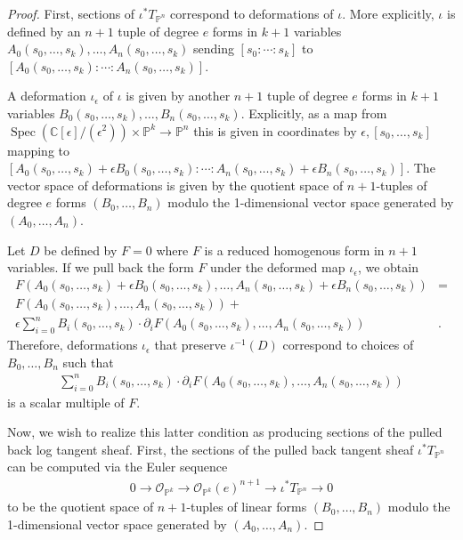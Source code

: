\documentclass[11pt,reqno]{amsart}
\theoremstyle{plain}
\theoremstyle{definition}
\theoremstyle{remark}
\numberwithin{equation}{section}
\renewcommand{\to}{{\longrightarrow}}
\numberwithin{equation}{section}
\begin{document}
\begin{proof}
First, sections of $\iota^{*}T_{\mathbb{P}^n}$ correspond to deformations of $\iota$. More explicitly, $\iota$ is defined by an $n+1$ tuple of degree $e$ forms in $k+1$ variables $A_0(s_0,\ldots,s_k),\ldots,A_n(s_0,\ldots,s_k)$ sending $[s_0:\cdots:s_k]$ to $[A_0(s_0,\ldots,s_k):\cdots:A_n(s_0,\ldots,s_k)]$.

A deformation $\iota_{\epsilon}$ of $\iota$ is given by another $n+1$ tuple of degree $e$ forms in $k+1$ variables $B_0(s_0,\ldots,s_k),\ldots,B_n(s_0,\ldots,s_k)$. Explicitly, as a map from $\operatorname{Spec}(\mathbb{C}[\epsilon]/(\epsilon^2))\times \mathbb{P}^k\to \mathbb{P}^n$ this is given in coordinates by $\epsilon,[s_0,\ldots,s_k]$ mapping to $[A_0(s_0,\ldots,s_k)+\epsilon B_0(s_0,\ldots,s_k):\cdots:A_n(s_0,\ldots,s_k)+\epsilon B_n(s_0,\ldots,s_k)]$. The vector space of deformations is given by the quotient space of $n+1$-tuples of degree $e$ forms $(B_0,\ldots,B_{n})$ modulo the 1-dimensional vector space generated by $(A_0,\ldots,A_{n})$.

Let $D$ be defined by $F=0$ where $F$ is a reduced homogenous form in $n+1$ variables. If we pull back the form $F$ under the deformed map  $\iota_{\epsilon}$, we obtain
\begin{align*}
    F(A_0(s_0,\ldots,s_k)+\epsilon B_0(s_0,\ldots,s_k),\ldots,A_n(s_0,\ldots,s_k)+\epsilon B_n(s_0,\ldots,s_k))&=\\
    F(A_0(s_0,\ldots,s_k),\ldots,A_n(s_0,\ldots,s_k))+&\\\epsilon \sum_{i=0}^{n}B_i(s_0,\ldots,s_k) \cdot \partial_iF (A_0(s_0,\ldots,s_k),\ldots,A_n(s_0,\ldots,s_k))&.
\end{align*}
Therefore, deformations $\iota_{\epsilon}$ that preserve $\iota^{-1}(D)$ correspond to choices of $B_0,\ldots,B_n$ such that
\begin{align}
\label{multiple}
    \sum_{i=0}^{n}B_i(s_0,\ldots,s_k)\cdot \partial_iF (A_0(s_0,\ldots,s_k),\ldots,A_n(s_0,\ldots,s_k))
\end{align}
is a scalar multiple of $F$.

Now, we wish to realize this latter condition as producing sections of the pulled back log tangent sheaf. First, the sections of the pulled back tangent sheaf $\iota^{*}T_{\mathbb{P}^n}$ can be computed via the Euler sequence
\begin{align*}
    0\to \mathscr{O}_{\mathbb{P}^k}\to \mathscr{O}_{\mathbb{P}^k}(e)^{n+1}\to \iota^{*}T_{\mathbb{P}^n}\to 0
\end{align*}
to be the quotient space of $n+1$-tuples of linear forms $(B_0,\ldots,B_{n})$ modulo the 1-dimensional vector space generated by $(A_0,\ldots,A_{n})$.


\end{proof}
\end{document}
